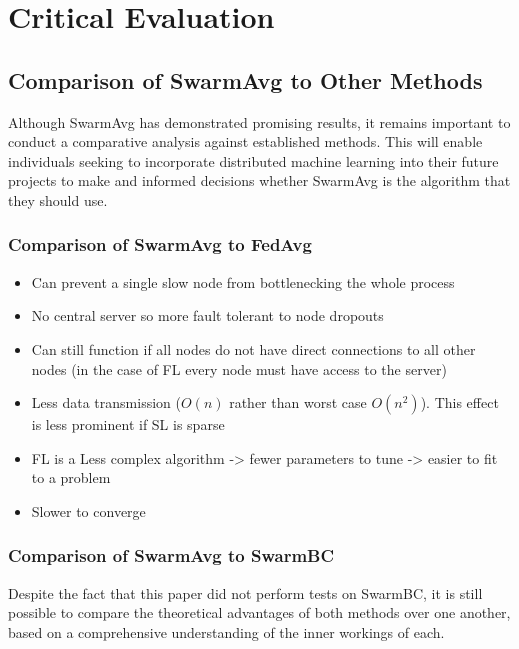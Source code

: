 \chapter{Critical Evaluation}
\section{Comparison of SwarmAvg to Other Methods}
Although SwarmAvg has demonstrated promising results, it remains important to conduct a comparative analysis against established methods. This will enable individuals seeking to incorporate distributed machine learning into their future projects to make and informed decisions whether SwarmAvg is the algorithm that they should use.

\subsection{Comparison of SwarmAvg to FedAvg}

\begin{itemize}
	\item Can prevent a single slow node from bottlenecking the whole process
	\item No central server so more fault tolerant to node dropouts
	\item Can still function if all nodes do not have direct connections to all other nodes (in the case of FL every node must have access to the server)
\end{itemize}


\begin{itemize}
	\item Less data transmission ($O(n)$ rather than worst case $O(n^2)$). This effect is less prominent if SL is sparse
	\item FL is a Less complex algorithm -> fewer parameters to tune -> easier to fit to a problem
	\item Slower to converge
\end{itemize}

\subsection{Comparison of SwarmAvg to SwarmBC}
Despite the fact that this paper did not perform tests on SwarmBC, it is still possible to compare the theoretical advantages of both methods over one another, based on a comprehensive understanding of the inner workings of each.

